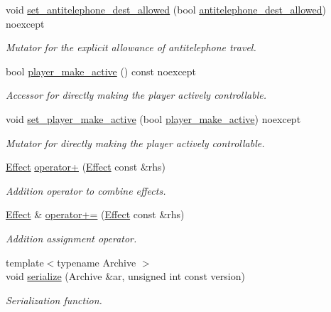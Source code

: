 \begin{DoxyCompactItemize}
void \hyperlink{classitem_1_1_effect_add9197b674f7ebd90c6a412d4a65e0e1}{set\+\_\+antitelephone\+\_\+dest\+\_\+allowed} (bool \hyperlink{classitem_1_1_effect_acb90e76e736868dd5307e8b6fe7e2e0d}{antitelephone\+\_\+dest\+\_\+allowed}) noexcept
\begin{DoxyCompactList}\small\item\em Mutator for the explicit allowance of antitelephone travel. \end{DoxyCompactList}\item 
bool \hyperlink{classitem_1_1_effect_a05de623b49c24c11fdb765c61c0367d0}{player\+\_\+make\+\_\+active} () const noexcept
\begin{DoxyCompactList}\small\item\em Accessor for directly making the player actively controllable. \end{DoxyCompactList}\item 
void \hyperlink{classitem_1_1_effect_aedb5619a40edeb90776d14691cdb80b1}{set\+\_\+player\+\_\+make\+\_\+active} (bool \hyperlink{classitem_1_1_effect_a05de623b49c24c11fdb765c61c0367d0}{player\+\_\+make\+\_\+active}) noexcept
\begin{DoxyCompactList}\small\item\em Mutator for directly making the player actively controllable. \end{DoxyCompactList}\item 
\hyperlink{classitem_1_1_effect}{Effect} \hyperlink{classitem_1_1_effect_a81c4b4c173683d278e1eae7e4ab8048a}{operator+} (\hyperlink{classitem_1_1_effect}{Effect} const \&rhs)
\begin{DoxyCompactList}\small\item\em Addition operator to combine effects. \end{DoxyCompactList}\item 
\hyperlink{classitem_1_1_effect}{Effect} \& \hyperlink{classitem_1_1_effect_af0d65e5a848289bfd28bfe980da51915}{operator+=} (\hyperlink{classitem_1_1_effect}{Effect} const \&rhs)
\begin{DoxyCompactList}\small\item\em Addition assignment operator. \end{DoxyCompactList}\item 
{\footnotesize template$<$typename Archive $>$ }\\void \hyperlink{classitem_1_1_effect_a3a78c050c37dd9204aa35c25a0f65282}{serialize} (Archive \&ar, unsigned int const version)
\begin{DoxyCompactList}\small\item\em Serialization function. \end{DoxyCompactList}\end{DoxyCompactItemize}


